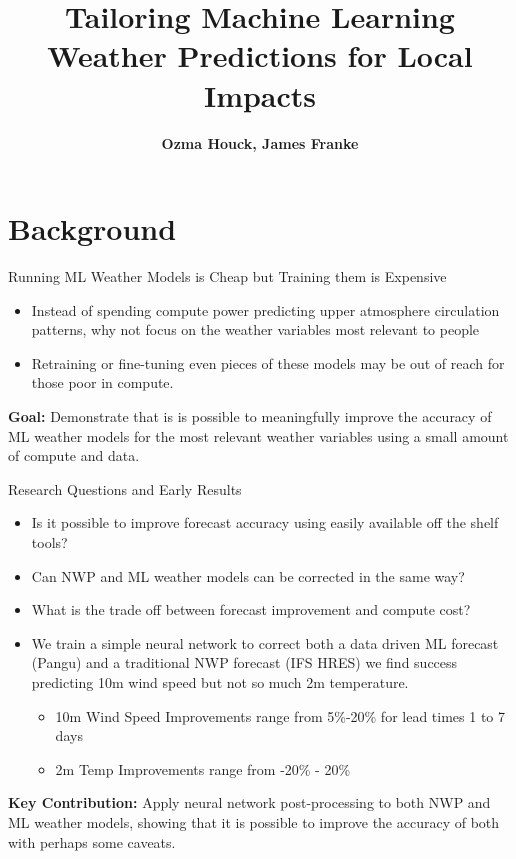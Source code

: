\documentclass[aspectratio=169, xcolor=dvipsnames]{beamer}
\title{Tailoring Machine Learning Weather Predictions for Local Impacts}
\author{\textbf{Ozma Houck, James Franke}}
\date{}
\begin{document}
\maketitle

\section{Background}

\begin{frame}{Running ML Weather Models is Cheap but Training them is Expensive}
    \begin{itemize}
        \item Instead of spending compute power predicting upper atmosphere circulation patterns, why not focus on the weather variables most relevant to people
        \item Retraining or fine-tuning even pieces of these models may be out of reach for those poor in compute.

    \end{itemize}
    \pause 
    \vspace{0.5em}
    \textbf{Goal:} %
    Demonstrate that is is possible to meaningfully improve the accuracy of ML weather models for the most relevant weather variables using a small amount of compute and data.
\end{frame}


\begin{frame}{Research Questions and Early Results}
\begin{itemize}
    \item Is it possible to improve forecast accuracy using easily available off the shelf tools?
    \item Can NWP and ML weather models can be corrected in the same way? 
    \item What is the trade off between forecast improvement and compute cost?
    \item We train a simple neural network to correct both a data driven ML forecast (Pangu) and a traditional NWP forecast (IFS HRES) we find success predicting 10m wind speed but not so much 2m temperature. 
    \begin{itemize}
        \item 10m Wind Speed Improvements range from 5\%-20\% for lead times 1 to 7 days
        \item 2m Temp Improvements range from  -20\% - 20\%
    \end{itemize}
\end{itemize}

\vspace{0.5em}
\textbf{Key Contribution:} Apply neural network post-processing to both NWP and ML weather models, showing that it is possible to improve the accuracy of both with perhaps some caveats.
\end{frame}
\end{document}
